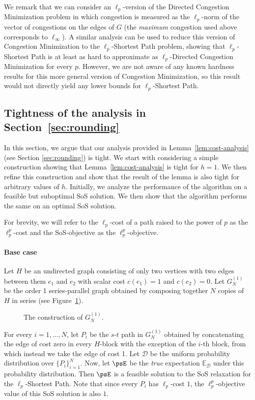 \documentclass[11pt,a4paper]{article}
\begin{document}
We remark that we can consider an $\ell_p$-version of the Directed Congestion Minimization problem in which congestion is measured as the $\ell_p$-norm of the vector of congestions on the edges of $G$ (the \emph{maximum} congestion used above corresponds to $\ell_\infty$). A similar analysis can be used to reduce this version of Congestion Minimization to the $\ell_p$-Shortest Path problem, showing that $\ell_p$-Shortest Path is at least as hard to approximate as $\ell_p$-Directed Congestion Minimization for every $p$. However, we are not aware of any known hardness results for this more general version of Congestion Minimization, so this result would not directly yield any lower bounds for  $\ell_p$-Shortest Path.

\subsection{Tightness of the analysis in Section~\ref{sec:rounding}}\label{sec:tightness-of-analysis}
In this section, we argue that our analysis provided in Lemma~\ref{lem:cost-analysis} (see Section \ref{sec:rounding}) is tight. 
We start with considering a simple construction showing that Lemma~\ref{lem:cost-analysis} is tight for $h=1$. We then refine this construction and show that the result of the lemma is also tight for arbitrary values of $h$. Initially, we analyze the performance of the algorithm on a feasible but suboptimal SoS solution. We then show that the algorithm performs the same on an optimal SoS solution.

For brevity, we will refer to the $\ell_p$-cost of a path raised to the power of $p$ as the $\ell_p^p$-cost and the SoS-objective as the $\ell_p^p$-objective.

\paragraph{Base case} Let $H$ be an undirected graph consisting of only two vertices with two edges between them $e_1$ and $e_2$ with scalar cost $c(e_1)=1$ and $c(e_2) = 0$. Let $G^{(1)}_N$ be the order 1 series-parallel graph obtained by composing together $N$ copies of $H$ in series (see Figure~\ref{fig:first_tightness_proof}). 
\begin{figure}[H]
    \centering
    
    \caption{The construction of $G^{(1)}_N$.}
    \label{fig:first_tightness_proof}
\end{figure}
For every $i=1, \dots , N$, let $P_i$ be the $s$-$t$ path in $G^{(1)}_N$ obtained by concatenating the edge of cost zero in every $H$-block with the exception of the $i$-{th} block, from which instead we take the edge of cost 1. Let  $\mathcal{D}$ be the uniform probability distribution over $\{P_i\}_{i=1}^N$. Now, let $\psE$ be the \textit{true} expectation $\mathbb{E}_{\mathcal{D}}$ under this probability distribution. Then $\psE$ is a feasible solution to the SoS relaxation for the $\ell_p$-Shortest Path. Note that since every $P_i$ has $\ell_p$-cost $1$, the $\ell_p^p$-objective value of this SoS solution is also $1$. 
\end{document}
